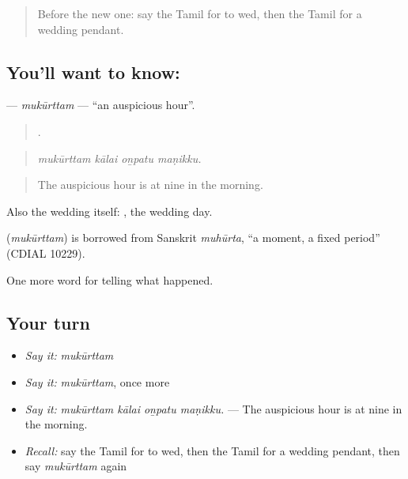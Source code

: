 \label{lesson:TA-C322-mukurttam}



\begin{quote}
Before the new one: say the Tamil for to wed, then the Tamil for a wedding pendant.
\end{quote}

\subsection*{You'll want to know: }
\textbf{} — \emph{mukūrttam} — \textquotedblleft{}an auspicious hour\textquotedblright{}.

\begin{quote}
   .
\end{quote}

\begin{quote}
\emph{mukūrttam kālai oṉpatu maṇikku.}
\end{quote}

\begin{quote}
The auspicious hour is at nine in the morning.
\end{quote}

Also the wedding itself:  , the wedding day.

\begin{cousinweb}
\textbf{} (\emph{mukūrttam}) is borrowed from Sanskrit \emph{muhūrta}, \textquotedblleft{}a moment, a fixed period\textquotedblright{} (CDIAL 10229).
\end{cousinweb}

\begin{grammarlens}[title={What you've built}]
One more word for telling what happened.
\end{grammarlens}

\subsection*{Your turn}
\begin{itemize}
\raggedright
  \item \emph{Say it:} \emph{mukūrttam}
  \item \emph{Say it:} \emph{mukūrttam}, once more
  \item \emph{Say it:} \emph{mukūrttam kālai oṉpatu maṇikku.} — The auspicious hour is at nine in the morning.
  \item \emph{Recall:} say the Tamil for to wed, then the Tamil for a wedding pendant, then say \emph{mukūrttam} again
\end{itemize}

